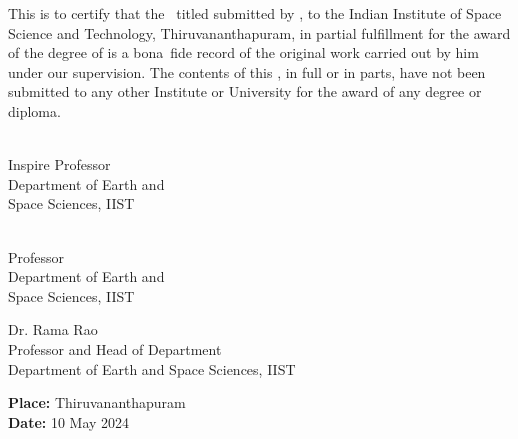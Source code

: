 \begin{ThesisCertificate}

\noindent This is to certify that the \Doctype\ titled \textbf{\textit{\Title}}
submitted by {\bf\Author}, to the Indian Institute of Space Science and
Technology, Thiruvananthapuram, in partial fulfillment for the award of the degree of {\bf\Degreetext} is a bona~fide record of the original work carried
out by him under our supervision. The contents of this \Doctype, in full or in parts, have not been submitted to any other Institute or University for the award of any degree or diploma.

\vspace{35mm}
\noindent
\begin{minipage}{0.5\textwidth}
\begin{flushleft}
\vspace*{-5mm}
\FirstAdvisor \\
Inspire Professor \\
Department of Earth and \\Space Sciences, IIST

\end{flushleft}
\end{minipage}
\hspace{2cm}
\begin{minipage}{0.5\textwidth}
\vspace{-5mm}
\begin{flushleft}
\SecondAdvisor \\
Professor \\
Department of Earth and \\Space Sciences, IIST
\end{flushleft}
\end{minipage}

\begin{center}
\vspace{35mm}
Dr. Rama Rao \\
Professor and Head of Department \\
Department of Earth and Space Sciences, IIST
\end{center}


\vspace{21mm}
\noindent
\textbf{Place: }Thiruvananthapuram\\
\textbf{Date: }10 May 2024

\end{ThesisCertificate}

